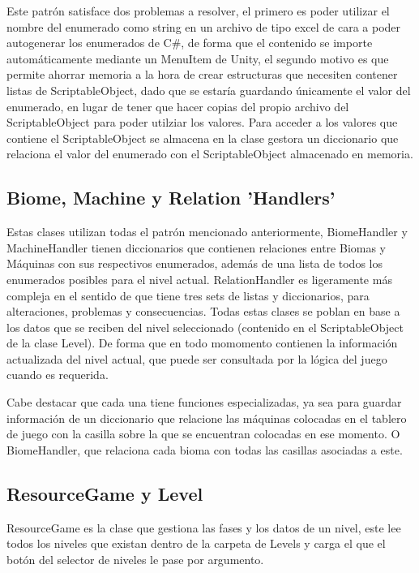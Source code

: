Este patrón satisface dos problemas a resolver, el primero es poder utilizar el nombre del enumerado como string en un archivo de tipo excel de cara a poder autogenerar los enumerados de C\#, de forma que el contenido se importe automáticamente mediante un MenuItem de Unity, el segundo motivo es que permite ahorrar memoria a la hora de crear estructuras que necesiten contener listas de ScriptableObject, dado que se estaría guardando únicamente el valor del enumerado, en lugar de tener que hacer copias del propio archivo del ScriptableObject para poder utilziar los valores. Para acceder a los valores que contiene el ScriptableObject se almacena en la clase gestora un diccionario que relaciona el valor del enumerado con el ScriptableObject almacenado en memoria. 

\subsection{Biome, Machine y Relation 'Handlers'}

Estas clases utilizan todas el patrón mencionado anteriormente, BiomeHandler y MachineHandler tienen diccionarios que contienen relaciones entre Biomas y Máquinas con sus respectivos enumerados, además de una lista de todos los enumerados posibles para el nivel actual. RelationHandler es ligeramente más compleja en el sentido de que tiene tres sets de listas y diccionarios, para alteraciones, problemas y consecuencias. Todas estas clases se poblan en base a los datos que se reciben del nivel seleccionado (contenido en el ScriptableObject de la clase Level). De forma que en todo momomento contienen la información actualizada del nivel actual, que puede ser consultada por la lógica del juego cuando es requerida. 

Cabe destacar que cada una tiene funciones especializadas, ya sea para guardar información de un diccionario que relacione las máquinas colocadas en el tablero de juego con la casilla sobre la que se encuentran colocadas en ese momento. O BiomeHandler, que relaciona cada bioma con todas las casillas asociadas a este.

\subsection{ResourceGame y Level}

ResourceGame es la clase que gestiona las fases y los datos de un nivel, este lee todos los niveles que existan dentro de la carpeta de Levels y carga el que el botón del selector de niveles le pase por argumento.

